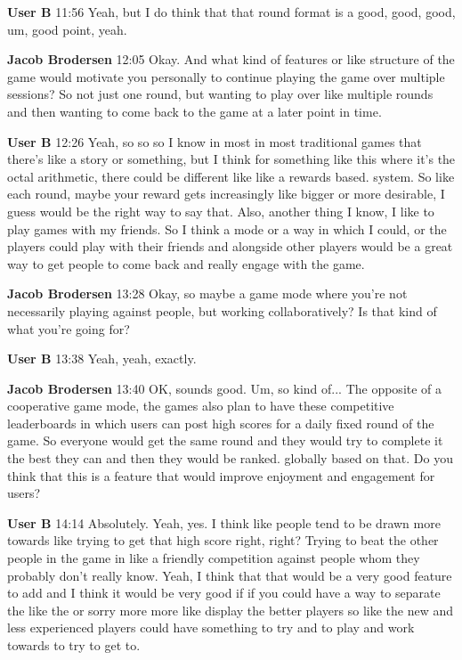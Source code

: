 \documentclass{article}
\begin{document}
\noindent \textbf{User B}   11:56
Yeah, but I do think that that round format is a good, good, good, um, good point, yeah.

\noindent \textbf{Jacob Brodersen}   12:05
Okay. And what kind of features or like structure of the game would motivate you personally to continue playing the game over multiple sessions? So not just one round, but wanting to play over like multiple rounds and then wanting to come back to the game at a later point in time.

\noindent \textbf{User B}   12:26
Yeah, so so so I know in most in most traditional games that there's like a story or something, but I think for something like this where it's the octal arithmetic, there could be different like like a rewards based.
system. So like each round, maybe your reward gets increasingly like bigger or more desirable, I guess would be the right way to say that. Also, another thing I know, I like to play games with my friends.
So I think a mode or a way in which I could, or the players could play with their friends and alongside other players would be a great way to get people to come back and really engage with the game.

\noindent \textbf{Jacob Brodersen}   13:28
Okay, so maybe a game mode where you're not necessarily playing against people, but working collaboratively? Is that kind of what you're going for?

\noindent \textbf{User B}   13:38
Yeah, yeah, exactly.

\noindent \textbf{Jacob Brodersen}   13:40
OK, sounds good.
Um, so kind of...
The opposite of a cooperative game mode, the games also plan to have these competitive leaderboards in which users can post high scores for a daily fixed round of the game. So everyone would get the same round and they would try to complete it the best they can and then they would be ranked.
globally based on that. Do you think that this is a feature that would improve enjoyment and engagement for users?

\noindent \textbf{User B}   14:14
Absolutely. Yeah, yes. I think like people tend to be drawn more towards like trying to get that high score right, right? Trying to beat the other people in the game in like a friendly competition against
people whom they probably don't really know.
Yeah, I think that that would be a very good feature to add and I think it would be very good if if you could have a way to separate the like the or sorry more more
like display the better players so like the new and less experienced players could have something to try and to play and work towards to try to get to.
\end{document}
